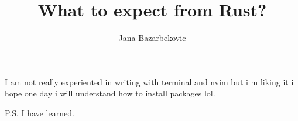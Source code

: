 \title{What to expect from Rust?}
\author{\huge{Jana Bazarbekovic}}


I am not really experiented in writing with terminal and nvim but i m liking it
i hope one day i will understand how to install packages lol.

P.S. I have learned.

